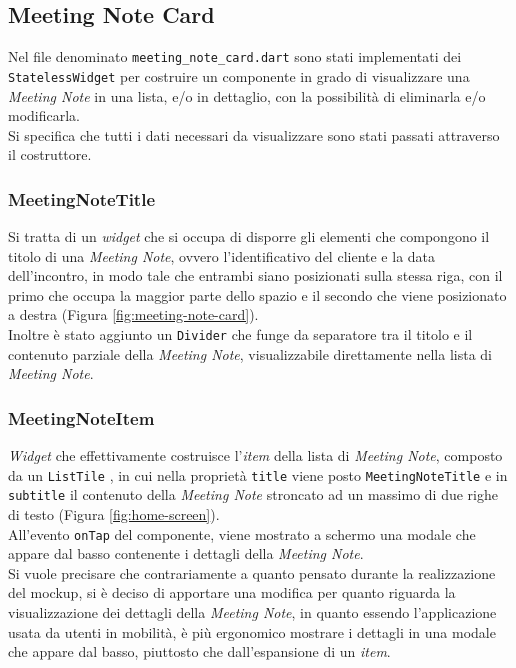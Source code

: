\subsection{Meeting Note Card}
\label{subsec:meeting-note-card}

Nel file denominato \lstinline{meeting_note_card.dart} sono stati implementati dei \lstinline{StatelessWidget} per costruire un componente in grado di visualizzare una \emph{Meeting Note} in una lista, e/o in dettaglio, con la possibilità di eliminarla e/o modificarla. \\
Si specifica che tutti i dati necessari da visualizzare sono stati passati attraverso il costruttore.

\subsubsection*{MeetingNoteTitle}
\label{subsubsec:meeting-note-title}

Si tratta di un \emph{widget} che si occupa di disporre gli elementi che compongono il titolo di una 
\emph{Meeting Note}, ovvero l'identificativo del cliente e la data dell'incontro, in modo tale che entrambi siano posizionati sulla stessa riga, con il primo che occupa la maggior parte dello spazio e il secondo che viene posizionato a destra (Figura \ref{fig:meeting-note-card}).\\
Inoltre è stato aggiunto un \lstinline{Divider} \cite{site:divider} che funge da separatore tra il titolo e il contenuto parziale della \emph{Meeting Note}, visualizzabile direttamente nella lista di \emph{Meeting Note}.

\subsubsection*{MeetingNoteItem}
\label{subsubsec:meeting-note-item}

\emph{Widget} che effettivamente costruisce l'\emph{item} della lista di \emph{Meeting Note}, composto da un \lstinline{ListTile} \cite{site:list-tile}, in cui nella proprietà \lstinline{title} viene posto \lstinline{MeetingNoteTitle} e in \lstinline{subtitle} il contenuto della \emph{Meeting Note} stroncato ad un massimo di due righe di testo (Figura \ref{fig:home-screen}).\\
All'evento \lstinline{onTap} del componente, viene mostrato a schermo una modale che appare dal basso contenente i dettagli della \emph{Meeting Note}.\\
Si vuole precisare che contrariamente a quanto pensato durante la realizzazione del \gls{mockup}\glsoccur, si è deciso di apportare una modifica per quanto riguarda la visualizzazione dei dettagli della \emph{Meeting Note}, in quanto essendo l'applicazione usata da utenti in mobilità, è più ergonomico mostrare i dettagli in una modale che appare dal basso, piuttosto che dall'espansione di un \emph{item}.


